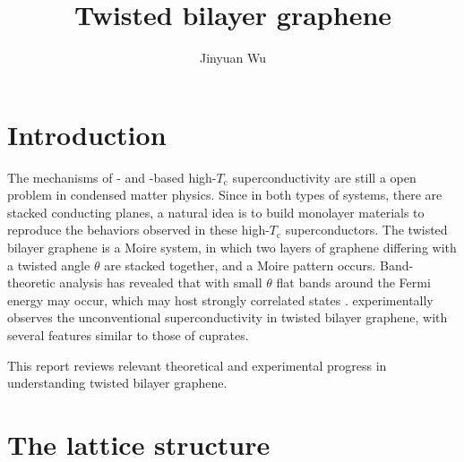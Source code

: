 \documentclass[hyperref, a4paper]{article}
\title{Twisted bilayer graphene}
\author{Jinyuan Wu}
\begin{document}
    
\maketitle

\section{Introduction}

The mechanisms of - and -based high-$T_{\text{c}}$ superconductivity 
are still a open problem in condensed matter physics.
Since in both types of systems, 
there are stacked conducting planes, 
a natural idea is to build monolayer materials to reproduce the behaviors observed in 
these high-$T_{\text{c}}$ superconductors.
The twisted bilayer graphene is a Moire system,
in which two layers of graphene differing with a twisted angle $\theta$
are stacked together,
and a Moire pattern occurs.
Band-theoretic analysis has revealed that with small $\theta$
flat bands around the Fermi energy may occur,
which may host strongly correlated states \cite{bistritzer_moire_2011}.
\cite{cao_unconventional_2018} experimentally observes the unconventional superconductivity
in twisted bilayer graphene,
with several features similar to those of cuprates.

This report reviews relevant theoretical and experimental progress in understanding twisted bilayer graphene.

\section{The lattice structure}\label{sec:lattice}
\end{document}
